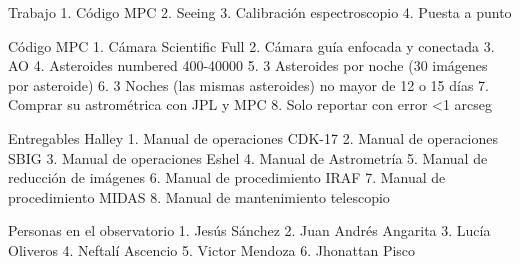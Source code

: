 Trabajo
    1. Código MPC
    2. Seeing
    3. Calibración espectroscopio
    4. Puesta a punto 

Código MPC
    1. Cámara Scientific Full
    2. Cámara guía enfocada y conectada
    3. AO
    4. Asteroides numbered 400-40000
    5. 3 Asteroides por noche (30 imágenes por asteroide)
    6. 3 Noches (las mismas asteroides) no mayor de 12 o 15 días
    7. Comprar su astrométrica con JPL y MPC
    8. Solo reportar con error <1 arcseg

Entregables Halley
    1. Manual de operaciones CDK-17
    2. Manual de operaciones SBIG
    3. Manual de operaciones Eshel
    4. Manual de Astrometría
    5. Manual de reducción de imágenes
    6. Manual de procedimiento IRAF
    7. Manual de procedimiento MIDAS
    8. Manual de mantenimiento telescopio

Personas en el observatorio
    1. Jesús Sánchez
    2. Juan Andrés Angarita
    3. Lucía Oliveros
    4. Neftalí Ascencio
    5. Victor Mendoza
    6. Jhonattan Pisco
